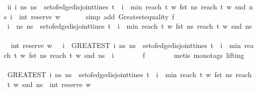 \begin{isabellebody}
{\isasymor}\ ii\ {\isacharparenleft}{\isasymlambda}i{\isachardot}\ {\isasymexists}ns{\isachardot}\ ns\ {\isasymin}\ set{\isacharunderscore}of{\isacharunderscore}edge{\isacharunderscore}disjoint{\isacharunderscore}tines\ t\ {\isasymand}\ i\ {\isacharequal}\ min\ {\isacharparenleft}reach\ t\ w\ {\isacharparenleft}fst\ ns{\isacharparenright}{\isacharparenright}\ {\isacharparenleft}reach\ t\ w\ {\isacharparenleft}snd\ ns{\isacharparenright}{\isacharparenright}{\isacharparenright}\ i\ {\isacharequal}\ int\ {\isacharparenleft}reserve\ w\ {\isacharbrackleft}{\isacharbrackright}{\isacharparenright}{\isachardoublequoteclose}\isanewline
\ \ \ \ \isamarkupfalse%
\ {\isacharparenleft}simp\ add{\isacharcolon}\ Greatest{\isacharunderscore}equality\ f{}{\isacharparenright}\isanewline
\ \ \isamarkupfalse%
\ \isamarkupfalse%
\ {\isachardoublequoteopen}{\isasymAnd}i{\isachardot}\ \ {\isacharparenleft}{\isasymforall}ns{\isachardot}\ ns\ {\isasymnotin}\ set{\isacharunderscore}of{\isacharunderscore}edge{\isacharunderscore}disjoint{\isacharunderscore}tines\ t\ {\isasymor}\ i\ {\isasymnoteq}\ min\ {\isacharparenleft}reach\ t\ w\ {\isacharparenleft}fst\ ns{\isacharparenright}{\isacharparenright}\ {\isacharparenleft}reach\ t\ w\ {\isacharparenleft}snd\ ns{\isacharparenright}{\isacharparenright}{\isacharparenright}\ \isanewline
{\isasymor}\ {\isasymnot}\ int\ {\isacharparenleft}reserve\ w\ {\isacharbrackleft}{\isacharbrackright}{\isacharparenright}\ {\isasymle}\ i\ {\isasymor}\ {\isacharparenleft}GREATEST\ i{\isachardot}\ {\isasymexists}ns{\isachardot}\ ns\ {\isasymin}\ set{\isacharunderscore}of{\isacharunderscore}edge{\isacharunderscore}disjoint{\isacharunderscore}tines\ t\ {\isasymand}\ i\ {\isacharequal}\ min\ {\isacharparenleft}reach\ t\ w\ {\isacharparenleft}fst\ ns{\isacharparenright}{\isacharparenright}\ {\isacharparenleft}reach\ t\ w\ {\isacharparenleft}snd\ ns{\isacharparenright}{\isacharparenright}{\isacharparenright}\ {\isacharequal}\ i{\isachardoublequoteclose}\isanewline
\ \ \ \ \ \ \isamarkupfalse%
\ f{}\isanewline
\ \ \ \ \ \ \isamarkupfalse%
\ {\isacharparenleft}metis\ {\isacharparenleft}mono{\isacharunderscore}tags{\isacharcomma}\ lifting{\isacharparenright}{\isacharparenright}\ \ \isanewline
\ \ \ \ \isamarkupfalse%
\ \isamarkupfalse%
\ {\isachardoublequoteopen}{\isacharparenleft}GREATEST\ i{\isachardot}\ {\isasymexists}ns{\isachardot}\ ns\ {\isasymin}\ set{\isacharunderscore}of{\isacharunderscore}edge{\isacharunderscore}disjoint{\isacharunderscore}tines\ t\ {\isasymand}\ i\ {\isacharequal}\ min\ {\isacharparenleft}reach\ t\ w\ {\isacharparenleft}fst\ ns{\isacharparenright}{\isacharparenright}\ {\isacharparenleft}reach\ t\ w\ {\isacharparenleft}snd\ ns{\isacharparenright}{\isacharparenright}{\isacharparenright}\ {\isacharequal}\ int\ {\isacharparenleft}reserve\ w\ {\isacharbrackleft}{\isacharbrackright}{\isacharparenright}{\isachardoublequoteclose}\isanewline

\end{isabellebody}
